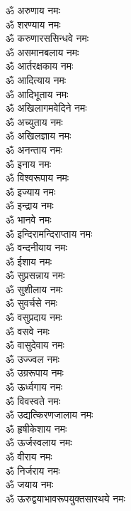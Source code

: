 \begin{multicols}{2}
    \begin{flushleft}
        ॐ अरुणाय नमः\\
        ॐ शरण्याय नमः\\
        ॐ करुणारससिन्धवे नमः\\
        ॐ असमानबलाय नमः\\
        ॐ आर्तरक्षकाय नमः\\
        ॐ आदित्याय नमः\\
        ॐ आदिभूताय नमः\\
        ॐ अखिलागमवेदिने नमः\\
        ॐ अच्युताय नमः\\
        ॐ अखिलज्ञाय नमः\hfill{}\\
        ॐ अनन्ताय नमः\\
        ॐ इनाय नमः\\
        ॐ विश्वरूपाय नमः\\
        ॐ इज्याय नमः\\
        ॐ इन्द्राय नमः\\
        ॐ भानवे नमः\\
        ॐ इन्दिरामन्दिराप्ताय नमः\\
        ॐ वन्दनीयाय नमः\\
        ॐ ईशाय नमः\\
        ॐ सुप्रसन्नाय नमः\hfill{}\\
        ॐ सुशीलाय नमः\\
        ॐ सुवर्चसे नमः\\
        ॐ वसुप्रदाय नमः\\
        ॐ वसवे नमः\\
        ॐ वासुदेवाय नमः\\
        ॐ उज्ज्वल नमः\\
        ॐ उग्ररूपाय नमः\\
        ॐ ऊर्ध्वगाय नमः\\
        ॐ विवस्वते नमः\\
        ॐ उद्यत्किरणजालाय नमः\hfill{}\\
        ॐ हृषीकेशाय नमः\\
        ॐ ऊर्जस्वलाय नमः\\
        ॐ वीराय नमः\\
        ॐ निर्जराय नमः\\
        ॐ जयाय नमः\\
        ॐ ऊरुद्वयाभावरूपयुक्तसारथये नमः\\

\end{flushleft}
\end{multicols}
